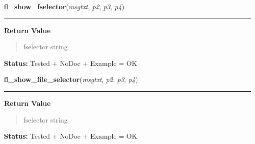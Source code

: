     \label{xformslib:library:fl_show_fselector}

    \vspace{0.5ex}

\hspace{.8\funcindent}\begin{boxedminipage}{\funcwidth}

    \raggedright \textbf{fl\_show\_fselector}(\textit{msgtxt}, \textit{p2}, \textit{p3}, \textit{p4})

    \vspace{-1.5ex}

    \rule{\textwidth}{0.5\fboxrule}
\setlength{\parskip}{2ex}
\setlength{\parskip}{1ex}
      \textbf{Return Value}
    \vspace{-1ex}

      \begin{quote}
      fselector string

      \end{quote}

\textbf{Status:} Tested + NoDoc + Example = OK



    \end{boxedminipage}

    \label{xformslib:library:fl_show_fselector}

    \vspace{0.5ex}

\hspace{.8\funcindent}\begin{boxedminipage}{\funcwidth}

    \raggedright \textbf{fl\_show\_file\_selector}(\textit{msgtxt}, \textit{p2}, \textit{p3}, \textit{p4})

    \vspace{-1.5ex}

    \rule{\textwidth}{0.5\fboxrule}
\setlength{\parskip}{2ex}
\setlength{\parskip}{1ex}
      \textbf{Return Value}
    \vspace{-1ex}

      \begin{quote}
      fselector string

      \end{quote}

\textbf{Status:} Tested + NoDoc + Example = OK



    \end{boxedminipage}


